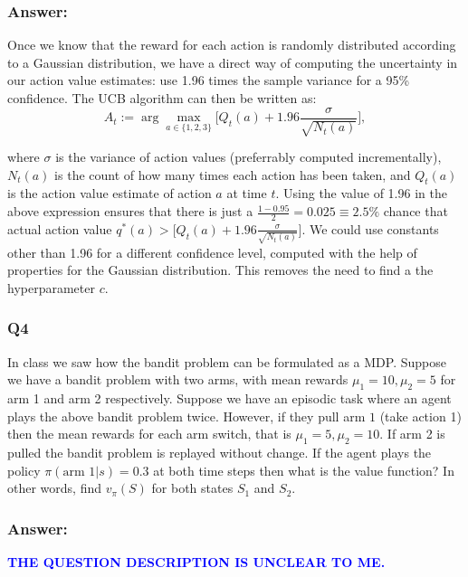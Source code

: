 \documentclass[a4paper, 10pt]{article}
\begin{document}
\subsubsection*{Answer:}
Once we know that the reward for each action is randomly distributed according to a Gaussian distribution, we have a direct way of computing the uncertainty in our action value estimates: use 1.96 times the sample variance for a 95\% confidence. The UCB algorithm can then be written as:
\begin{equation*}
  A_t := \arg\max_{a \in \{1, 2, 3\}} \Bigg[Q_t(a) + 1.96 \frac{\sigma}{\sqrt{N_t(a)}}\Bigg],
\end{equation*}

where $\sigma$ is the variance of action values (preferrably computed incrementally), $N_t(a)$ is the count of how many times each action has been taken, and $Q_t(a)$ is the action value estimate of action $a$ at time $t$. Using the value of 1.96 in the above expression ensures that there is just a $\frac{1-0.95}{2} = 0.025 \equiv 2.5\%$ chance that actual action value $q^*(a) > \Bigg[Q_t(a) + 1.96 \frac{\sigma}{\sqrt{N_t(a)}}\Bigg]$. We could use constants other than 1.96 for a different confidence level, computed with the help of properties for the Gaussian distribution. This removes the need to find a the hyperparameter $c$.

\subsubsection*{Q4}
In class we saw how the bandit problem can be formulated as a MDP. Suppose we have a bandit problem with two arms, with mean rewards $\mu_1 = 10, \mu_2=5$ for arm 1 and arm 2 respectively. Suppose we have an episodic task where an agent plays the above bandit problem twice. However, if they pull arm $1$ (take action 1) then the mean rewards for each arm switch, that is $\mu_1=5, \mu_2=10$. If arm 2 is pulled the bandit problem is replayed without change. If the agent plays the policy $\pi(\mbox{arm } 1|s) = 0.3$ at both time steps then what is the value function? In other words, find $v_{\pi}(S)$ for both states $S_1$ and $S_2$. 

\subsubsection*{Answer:}
\textcolor{blue}{\textbf{THE QUESTION DESCRIPTION IS UNCLEAR TO ME.}}
\end{document}
